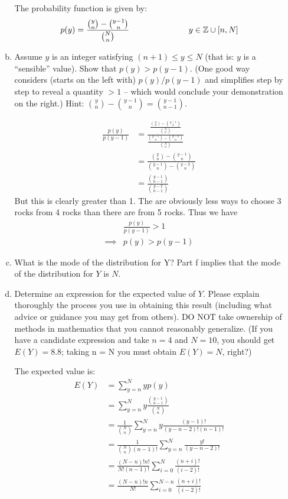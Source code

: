 \documentclass{scrartcl}
\begin{document}
\begin{enumerate}
\begin{enumerate}[a)]
The probability function is given by: $$p(y) = \frac{{y \choose n}-{y-1 \choose n}}{{N \choose n}}\text{\hspace{1in}} y\in\mathbb{Z}\cup[n,N]$$

\item Assume $y$ is an integer satisfying $(n + 1) \le y \le N$ (that is: $y$ is a “sensible” value). Show that $p(y) > p(y-1)$. (One good way considers (starts on the left with) $p(y)/p(y-1)$ and simplifies step by step to reveal a quantity $> 1$ – which would conclude your demonstration on the right.) Hint: ${y \choose n} - {y-1 \choose n}={y-1 \choose n-1}$.

\begin{align*}
  \frac{p(y)}{p(y-1)} &= \frac{\frac{{y \choose n}-{y-1 \choose n}}{{N \choose n}}}{\frac{{y-1 \choose n}-{y-2 \choose n}}{{N \choose n}}}\\
  &= \frac{{y \choose n}-{y-1 \choose n}}{{y-1 \choose n}-{y-2 \choose n}}\\
  &= \frac{{y-1 \choose n-1}}{{y-2 \choose n-1}}
\end{align*}
But this is clearly greater than 1. The are obviously less ways to choose 3 rocks from 4 rocks than there are from 5 rocks. Thus we have
\begin{align*}
  &\frac{p(y)}{p(y-1)} > 1\\
  \implies &p(y) > p(y-1)
\end{align*}

\item What is the mode of the distribution for Y?
  Part f implies that the mode of the distribution for $Y$ is $N$.\\

\item Determine an expression for the expected value of $Y$. Please explain thoroughly the process you use in obtaining this result (including what advice or guidance you may get from others). DO NOT take ownership of methods in mathematics that you cannot reasonably generalize. (If you have a candidate expression and take $n = 4$ and $N = 10$, you should get $E(Y) = 8.8$; taking n = N you must obtain $E(Y) = N$, right?)

The expected value is:
\begin{align*}
  E(Y) &= \sum_{y=n}^Nyp(y)\\
  &= \sum_{y=n}^Ny\frac{{y-1 \choose n-1}}{{N \choose n}}\\
  &= \frac{1}{{N \choose n}} \sum_{y=n}^Ny\frac{(y-1)!}{(y-n-2)!(n-1)!}\\
  &= \frac{1}{{N \choose n}(n-1)!} \sum_{y=n}^N\frac{y!}{(y-n-2)!}\\
  &= \frac{(N-n)!n!}{N!(n-1)!} \sum_{i=0}^N\frac{(n+i)!}{(i-2)!}\\
  &= \frac{(N-n)!n}{N!} \sum_{i=0}^{N-n}\frac{(n+i)!}{(i-2)!}\\
\end{align*}


\end{enumerate}
\end{enumerate}
\end{document}
